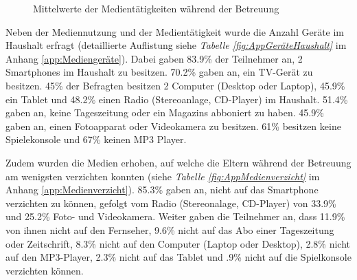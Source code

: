 \begin{figure}%
\caption{Mittelwerte der Medientätigkeiten während der Betreuung}\label{fig:Medientätigkeit}
{}
\end{figure}

Neben der Mediennutzung und der Medientätigkeit wurde die Anzahl Geräte im Haushalt erfragt (detaillierte Auflistung siehe \textit{Tabelle \ref{fig:AppGeräteHaushalt}} im Anhang \ref{app:Mediengeräte}). Dabei gaben 83.9\% der Teilnehmer an, 2 Smartphones im Haushalt zu besitzen. 70.2\% gaben an, ein TV-Gerät zu besitzen. 45\% der Befragten besitzen 2 Computer (Desktop oder Laptop), 45.9\% ein Tablet und 48.2\% einen Radio (Stereoanlage, CD-Player) im Haushalt. 51.4\% gaben an, keine Tageszeitung oder ein Magazins abboniert zu haben. 45.9\% gaben an, einen Fotoapparat oder Videokamera zu besitzen. 61\% besitzen keine Spielekonsole und 67\% keinen MP3 Player.

Zudem wurden die Medien erhoben, auf welche die Eltern während der Betreuung am wenigsten verzichten konnten (siehe \textit{Tabelle \ref{fig:AppMedienverzicht}} im Anhang \ref{app:Medienverzicht}). 85.3\% gaben an, nicht auf das Smartphone verzichten zu können, gefolgt vom Radio (Stereonalage, CD-Player) von 33.9\% und 25.2\% Foto- und Videokamera. Weiter gaben die Teilnehmer an, dass 11.9\% von ihnen nicht auf den Fernseher, 9.6\% nicht auf das Abo einer Tageszeitung oder Zeitschrift, 8.3\% nicht auf den Computer (Laptop oder Desktop), 2.8\% nicht auf den MP3-Player, 2.3\% nicht auf das Tablet und .9\% nicht auf die Spielkonsole verzichten können.

